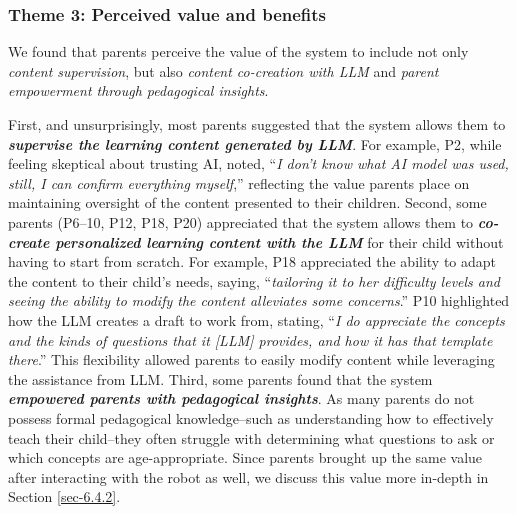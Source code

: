\subsubsection{Theme 3: Perceived value and benefits}
We found that parents perceive the value of the system to include not only \textit{content supervision}, but also \textit{content co-creation with LLM} and \textit{parent empowerment through pedagogical insights}.

First, and unsurprisingly, most parents suggested that the system allows them to \textit{\textbf{supervise the learning content generated by LLM}}. For example, P2, while feeling skeptical about trusting AI, noted, ``\textit{I don't know what AI model was used, still, I can confirm everything myself},'' reflecting the value parents place on maintaining oversight of the content presented to their children. Second, some parents (P6–10, P12, P18, P20) appreciated that the system allows them to \textit{\textbf{co-create personalized learning content with the LLM}} for their child without having to start from scratch. For example, P18 appreciated the ability to adapt the content to their child's needs, saying, ``\textit{tailoring it to her difficulty levels and seeing the ability to modify the content alleviates some concerns}.'' P10 highlighted how the LLM creates a draft to work from, stating, ``\textit{I do appreciate the concepts and the kinds of questions that it [LLM] provides, and how it has that template there}.'' This flexibility allowed parents to easily modify content while leveraging the assistance from LLM. Third, some parents found that the system \textit{\textbf{empowered parents with pedagogical insights}}. As many parents do not possess formal pedagogical knowledge--such as understanding how to effectively teach their child--they often struggle with determining what questions to ask or which concepts are age-appropriate. Since parents brought up the same value after interacting with the robot as well, we discuss this value more in-depth in Section \ref{sec-6.4.2}.